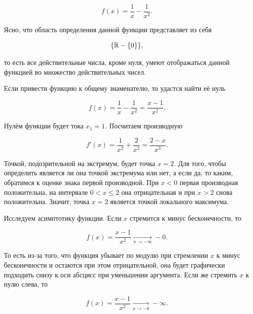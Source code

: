 \documentclass[12pt]{article}
\begin{document}
\begin{equation}
	f(x) = \dfrac{1}{x} - \dfrac{1}{x^2}.
\end{equation}

Ясно, что область определения данной функции представляет из себя

\begin{equation}
	\qty{\mathbb{R} - \qty{0}},
\end{equation}

то есть все действительные числа, кроме нуля, умеют отображаться данной функцией во множество действительных чисел.

\par Если привести функцию к общему знаменателю, то удастся найти её нуль

\begin{equation}
	f(x) = \dfrac{1}{x} - \dfrac{1}{x^2} = \dfrac{x - 1}{x^2}.
\end{equation}

Нулём функции будет тока $x_1 = 1$. Посчитаем производную

\begin{equation}
	f'(x) = \dfrac{1}{x^2} + \dfrac{2}{x^3} = \dfrac{2-x}{x^3}.
\end{equation}

Точкой, подозрительной на экстремум, будет точка $x=2$. Для того, чтобы определить является ли она точкой экстремума или нет, а если да, то каким, обратимся к оценке знака первой производной. При $x<0$ первая производная положительна, на интервале $ 0 < x \le 2$ она отрицательная и при $x>2$ снова положительна. Значит, точка $x=2$ является точкой локального максимума.

\par Исследуем асимптотику функции. Если $x$ стремится к минус бесконечности, то 

\begin{equation}
	f(x) = \dfrac{x - 1}{x^2} \underset{x\rightarrow-\infty}{\longrightarrow} -0.
\end{equation}

То есть из\--за того, что функция убывает по модулю при стремлении $x$ к минус бесконечности и остаются при этом отрицательной, она будет графически подходить снизу к оси абсцисс при уменьшении аргумента. Если же стремить $x$ к нулю слева, то

\begin{equation}
	f(x) = \dfrac{x - 1}{x^2} \underset{x\rightarrow-0}{\longrightarrow} -\infty.
\end{equation}
\end{document}
